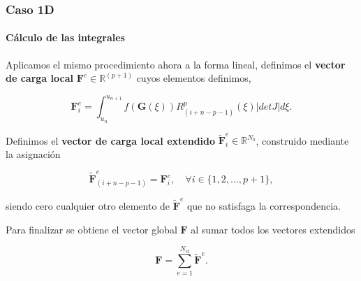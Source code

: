 \documentclass[compress]{beamer}
\newcommand\R{\mathbb{R}}
\begin{document}
\begin{frame}
	\frametitle{Caso 1D}
	\framesubtitle{Cálculo de las integrales}
	\scriptsize


	Aplicamos el mismo procedimiento ahora a la forma lineal, definimos el \textbf{vector de carga local}  $\mathbf{F}^e \in \R^{(p+1)}$ cuyos elementos definimos,

	\begin{definition}

		\begin{equation*}
			\mathbf{F}^e_i=\int_{u_n}^{u_{n+1}}f(\mathbf{G}(\xi))R_{(i+ n - p - 1)}^p(\xi)|det J|d\xi.
		\end{equation*}
		
	\end{definition}

	\begin{definition}

		Definimos el \textbf{vector de carga local extendido} $\tilde{\mathbf{F}}^e_i \in \R^{N_b}$, construido mediante la asignación

		\vspace{-10pt}
		\begin{equation*}
			\tilde{\mathbf{F}}^e_{(i+ n - p - 1)}=\mathbf{F}^e_i, \quad \forall i \in \{ 1,2, \dots ,p+1 \},
		\end{equation*}

		siendo cero cualquier otro elemento de $\tilde{\mathbf{F}}^e$ que no satisfaga la correspondencia.
		
	\end{definition}

	\begin{definition}

		Para finalizar se obtiene el vector global $\mathbf{F}$ al sumar todos los vectores extendidos
		
		\vspace{-5pt}
		\begin{equation*}
			\mathbf{F} = \sum_{e=1}^{N_{el}} \tilde{\mathbf{F}}^e.
		\end{equation*}
		
	\end{definition}
\end{frame}
\end{document}
